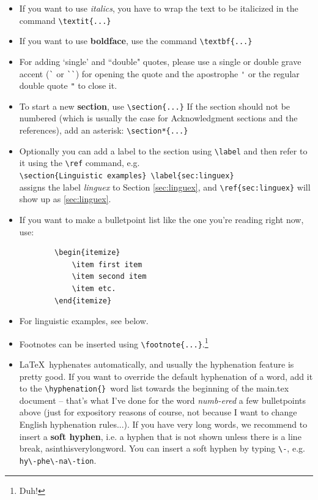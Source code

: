 \documentclass[]{constructions}
\begin{document}
\begin{itemize}
    \item If you want to use \textit{italics}, you have to wrap the text to be italicized in the command \verb!\textit{...}!
    \item If you want to use \textbf{boldface}, use the command \verb!\textbf{...}!
    \item For adding `single' and ``double" quotes, please use a single or double grave accent (\verb!`! or \verb!``!) for opening the quote and the apostrophe \verb!'! or the regular double quote \verb!"! to close it.
    \item To start a new \textbf{section}, use \verb!\section{...}! If the section should not be numbered (which is usually the case for Acknowledgment sections and the references), add an asterisk: \verb!\section*{...}!
    \item Optionally you can add a label to the section using \verb!\label! and then refer to it using the \verb!\ref! command, e.g. \\ \verb!\section{Linguistic examples} \label{sec:linguex}! \\ assigns the label \textit{linguex} to Section \ref{sec:linguex}, and \verb!\ref{sec:linguex}! will show up as \ref{sec:linguex}.
    \item If you want to make a bulletpoint list like the one you're reading right now, use:
    \begin{verbatim}
        \begin{itemize}
            \item first item
            \item second item
            \item etc.
        \end{itemize}
    \end{verbatim}
    \item For linguistic examples, see below.
    \item Footnotes can be inserted using \verb!\footnote{...}!.\footnote{Duh!}
    \item \LaTeX \ hyphenates automatically, and usually the hyphenation feature is pretty good. If you want to override the default hyphenation of a word, add it to the \verb!\hyphenation{}!\ word list towards the beginning of the main.tex document -- that's what I've done for the word \textit{numb-ered} a few bulletpoints above (just for expository reasons of course, not because I want to change English hyphenation rules...). If you have very long words, we recommend to insert a \textbf{soft hyphen}, i.e. a hyphen that is not shown unless there is a line break, as\-in\-this\-very\-long\-word. You can insert a soft hyphen by typing \verb!\-!, e.g. \verb!hy\-phe\-na\-tion!.
    

\end{itemize}
\end{document}
